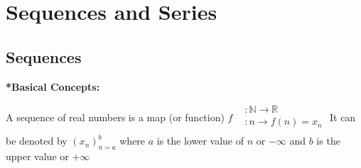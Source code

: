 \documentclass[12pt, a4paper]{book}
\begin{document}









\chapter{Sequences and Series}

\section{Sequences}
\textbf{*Basical Concepts:}

\begin{defn} A sequence of real numbers is a map (or function) \newline
  $f 
  \begin{alignedat}{2}
     &  :\mathbb{N} \rightarrow \mathbb{R}\\
     &  :n \rightarrow f(n)=x_n \\ 
  \end{alignedat}$ \newline
  It can be denoted by $(x_n)^b_{n=a}$ where $a$ is the lower value of $n$ or $-\infty$ and $b$ is the upper value or $+\infty$
\end{defn}
\end{document}
